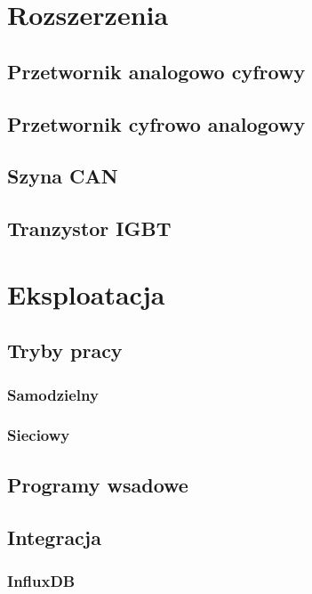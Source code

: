 \documentclass{beamer}
\begin{document}
	\section{Rozszerzenia}
	
        \subsection{Przetwornik analogowo cyfrowy}
        
        \subsection{Przetwornik cyfrowo analogowy}
        
        \subsection{Szyna CAN}
        
        \subsection{Tranzystor IGBT}
        
	\section{Eksploatacja}
        \subsection{Tryby pracy}
        
            \subsubsection{Samodzielny}
            
            \subsubsection{Sieciowy}
            
        \subsection{Programy wsadowe}
            
        \subsection{Integracja}
        
            \subsubsection{InfluxDB}
            
\end{document}
